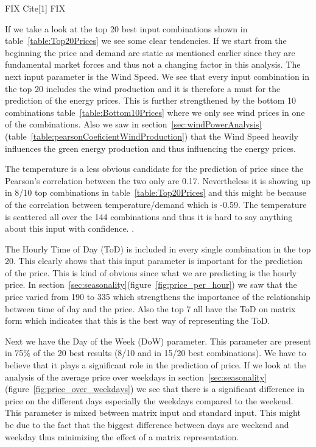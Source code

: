 FIX
Cite[1]
FIX


If we take a look at the top 20 best input combinations shown in table~\ref{table:Top20Prices} we see some clear tendencies. If we start from the beginning the price and demand are static as mentioned earlier since they are fundamental market forces and thus not a changing factor in this analysis. The next input parameter is the Wind Speed. We see that every input combination in the top 20 includes the wind production and it is therefore a must for the prediction of the energy prices. This is further strengthened by the bottom 10 combinations table~\ref{table:Bottom10Prices} where we only see wind prices in one of the combinations. Also we saw in section~\ref{sec:windPowerAnalysis}(table~\ref{table:pearsonCoeficientWindProduction}) that the Wind Speed heavily influences the green energy production and thus influencing the energy prices. 

The temperature is a less obvious candidate for the prediction of price since the Pearson's correlation between the two only are 0.17. Nevertheless it is showing up in 8/10 top combinations in table~\ref{table:Top20Prices} and this might be because of the correlation between temperature/demand which is -0.59. The temperature is scattered all over the 144 combinations and thus it is hard to say anything about this input with confidence. .

The Hourly Time of Day (ToD) is included in every single combination in the top 20. This clearly shows that this input parameter is important for the prediction of the price. This is kind of obvious since what we are predicting is the hourly price. In section~\ref{sec:seasonality}(figure~\ref{fig:price_per_hour}) we saw that the price varied from 190 to 335 which strengthens the importance of the relationship between time of day and the price. Also the top 7 all have the ToD on matrix form which indicates that this is the best way of representing the ToD.

Next we have the Day of the Week (DoW) parameter. This parameter are present in 75\% of the 20 best results (8/10 and in 15/20 best combinations). We have to believe that it plays a significant role in the prediction of price. If we look at the analysis of the average price over weekdays in section~\ref{sec:seasonality}(figure~\ref{fig:price_over_weekdays}) we see that there is a significant difference in price on the different days especially the weekdays compared to the weekend. This parameter is mixed between matrix input and standard input. This might be due to the fact that the biggest difference between days are weekend and weekday thus minimizing the effect of a matrix representation. 

